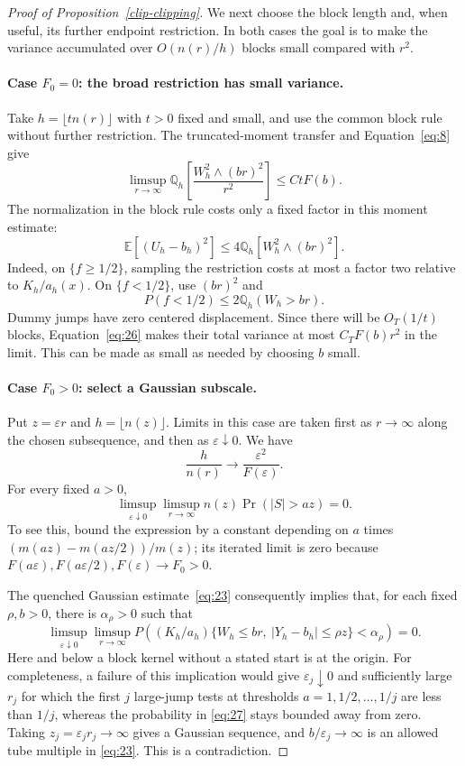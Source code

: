 \begin{proof}[Proof of Proposition~\ref{clip-clipping}]
We next choose the block length and, when useful, its further endpoint
restriction. In both cases the goal is to make the variance accumulated
over \(O(n(r)/h)\) blocks small compared with \(r^2\).

\paragraph{Case \(F_0=0\): the broad restriction has small variance.}
Take \(h=\lfloor tn(r)\rfloor\) with \(t>0\) fixed and small, and
use the common block rule without further restriction. The
truncated-moment transfer and Equation~\eqref{eq:8} give
\[
\limsup_{r\to\infty}
\mathbb Q_h\!\left[\frac{W_h^2\wedge (br)^2}{r^2}\right]
\le CtF(b).
\tag{26}\label{eq:26}
\]
The normalization in the block rule costs only a fixed factor in this
moment estimate:
\[
\mathbb E[(U_h-b_h)^2]
\le4\mathbb Q_h[W_h^2\wedge(br)^2].
\]
Indeed, on \(\{f\ge1/2\}\), sampling the restriction costs at most
a factor two relative to \(K_h/a_h(x)\). On \(\{f<1/2\}\), use
\((br)^2\) and
\[
P(f<1/2)\le2\mathbb Q_h(W_h>br).
\]
Dummy jumps have zero centered displacement. Since there will be
\(O_T(1/t)\) blocks, Equation~\eqref{eq:26} makes their total
variance at most \(C_TF(b)r^2\) in the limit. This can be made as
small as needed by choosing \(b\) small.

\paragraph{Case \(F_0>0\): select a Gaussian subscale.}
Put \(z=\varepsilon r\) and \(h=\lfloor n(z)\rfloor\). Limits in
this case are taken first as \(r\to\infty\) along the chosen
subsequence, and then as \(\varepsilon\downarrow0\). We have
\[
\frac{h}{n(r)}\longrightarrow
\frac{\varepsilon^2}{F(\varepsilon)}.
\]
For every fixed \(a>0\),
\[
\limsup_{\varepsilon\downarrow0}\limsup_{r\to\infty}
 n(z)\Pr(|S|>az)=0.
\]
To see this, bound the expression by a constant depending on \(a\)
times
\((m(az)-m(az/2))/m(z)\); its iterated limit is zero because
\(F(a\varepsilon),F(a\varepsilon/2),F(\varepsilon)\to F_0>0\).

The quenched Gaussian estimate~\eqref{eq:23} consequently implies that,
for each fixed \(\rho,b>0\), there is \(\alpha_\rho>0\) such that
\[
\limsup_{\varepsilon\downarrow0}\limsup_{r\to\infty}
P\left((K_h/a_h)\{W_h\le br,\ |Y_h-b_h|\le\rho z\}
       <\alpha_\rho\right)=0.
\tag{27}\label{eq:27}
\]
Here and below a block kernel without a stated start is at the origin.
For completeness, a failure of this implication would give
\(\varepsilon_j\downarrow0\) and sufficiently large \(r_j\) for
which the first \(j\) large-jump tests at thresholds
\(a=1,1/2,\ldots,1/j\) are less than \(1/j\), whereas the
probability in \eqref{eq:27} stays bounded away from zero. Taking
\(z_j=\varepsilon_jr_j\to\infty\) gives a Gaussian sequence, and
\(b/\varepsilon_j\to\infty\) is an allowed tube multiple in
\eqref{eq:23}. This is a contradiction.


\end{proof}
